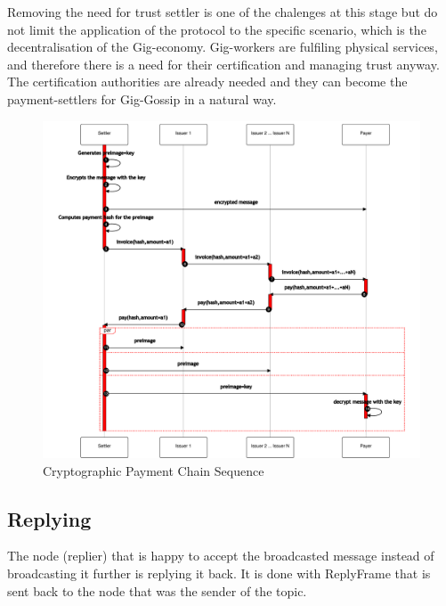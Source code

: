 \documentclass{article}
\begin{document}
Removing the need for trust settler is one of the chalenges at this stage but do not limit the application of the protocol to the specific scenario, which is the decentralisation of the Gig-economy. Gig-workers are fulfiling physical services, and therefore there is a need for their certification and managing trust anyway. The certification authorities are already needed and they can become the payment-settlers for Gig-Gossip in a natural way.

\begin{figure}
	\centering
	\includegraphics[scale=0.5]{PaymentChain.pdf}
	\caption{Cryptographic Payment Chain Sequence}
	\label{fig:cryptopaychain}
\end{figure}


\subsection{Replying}
The node (replier) that is happy to accept the broadcasted message instead of broadcasting it further is replying it back. It is done with ReplyFrame that is sent back to the node that was the sender of the topic.
\end{document}
